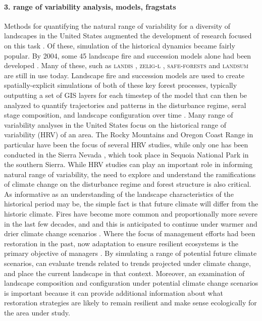 \documentclass[12pt]{article}
\begin{document}
\begin{spacing}{1}
\paragraph{3. range of variability analysis, models, fragstats}
Methods for quantifying the natural range of variability for a diversity of landscapes in the United States augmented the development of research focused on this task \citep{Landres1999}. Of these, simulation of the historical dynamics became fairly popular. By 2004, some 45 landscape fire and succession models alone had been developed \citep{Keane2004}. Many of these, such as \textsc{landis} \citep{He1999}, \textsc{zelig-l} \citep{Miller1999}, \textsc{safe-forests} \cite{Sessions1997} and \textsc{landsum} \citep{Keane2012} are still in use today. Landscape fire and succession models are used to create spatially-explicit simulations of both of these key forest processes, typically outputting a set of GIS layers for each timestep of the model that can then be analyzed to quantify trajectories and patterns in the disturbance regime, seral stage composition, and landscape configuration over time \citep{Keane2004}. Many range of variability analyses in the United States focus on the historical range of variability (HRV) of an area. The Rocky Mountains and Oregon Coast Range in particular have been the focus of several HRV studies, while only one has been conducted in the Sierra Nevada \citep{Miller1999}, which took place in Sequoia National Park in the southern Sierra. While HRV studies can play an important role in informing natural range of variability, the need to explore and understand the ramifications of climate change on the disturbance regime and forest structure is also critical. As informative as an understanding of the landscape characteristics of the historical period may be, the simple fact is that future climate will differ from the historic climate. Fires have become more common and proportionally more severe in the last few decades, and and this is anticipated to continue under warmer and drier climate change scenarios \citep{McKenzie2004,Westerling2007,Dale2001}. Where the focus of management efforts had been restoration in the past, now adaptation to ensure resilient ecosystems is the primary objective of managers \citep{Stephens2010}. By simulating a range of potential future climate scenarios, can evaluate trends related to trends projected under climate change, and place the current landscape in that context. Moreover, an examination of landscape composition and configuration under potential climate change scenarios is important because it can provide additional information about what restoration strategies are likely to remain resilient and make sense ecologically for the area under study. 



\end{spacing}
\end{document}
